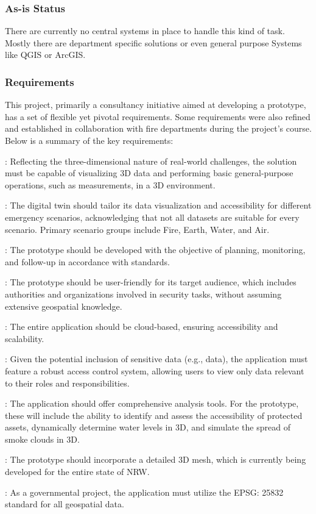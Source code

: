 \documentclass[11pt, titlepage, a4paper]{article}
\begin{document}
\subsubsection{As-is Status}
There are currently no central systems in place to handle this kind of task. Mostly there are department specific solutions or even general purpose Systems like QGIS or ArcGIS.


\subsubsection{Requirements}
This project, primarily a consultancy initiative aimed at developing a prototype, has a set of flexible yet pivotal requirements. Some requirements were also refined and established in collaboration with fire departments during the project's course. Below is a summary of the key requirements:

\begin{description}[]
    \item[Three-Dimensional Capability]: Reflecting the three-dimensional nature of real-world challenges, the solution must be capable of visualizing 3D data and performing basic general-purpose operations, such as measurements, in a 3D environment.
    \item[Scenario-Optimized Geodata]: The digital twin should tailor its data visualization and accessibility for different emergency scenarios, acknowledging that not all datasets are suitable for every scenario. Primary scenario groups include Fire, Earth, Water, and Air.
    \item[Compliance with \glsxtrshort{bhkg}]: The prototype should be developed with the objective of planning, monitoring, and follow-up in accordance with  standards.
    \item[Target Group - Authorities and Security Organizations]: The prototype should be user-friendly for its target audience, which includes authorities and organizations involved in security tasks, without assuming extensive geospatial knowledge.
    \item[Cloud-Based Solution]: The entire application should be cloud-based, ensuring accessibility and scalability.
    \item[Fine-Grained Access Control]: Given the potential inclusion of sensitive data (e.g.,  data), the application must feature a robust access control system, allowing users to view only data relevant to their roles and responsibilities.
    \item[Analysis Tools]: The application should offer comprehensive analysis tools. For the prototype, these will include the ability to identify and assess the accessibility of protected assets, dynamically determine water levels in 3D, and simulate the spread of smoke clouds in 3D.
    \item[Integration of 3D Meshes]: The prototype should incorporate a detailed 3D mesh, which is currently being developed for the entire state of NRW.
    \item[EPSG: 25832 Standard]: As a governmental project, the application must utilize the EPSG: 25832 standard for all geospatial data.
\end{description}
\end{document}
